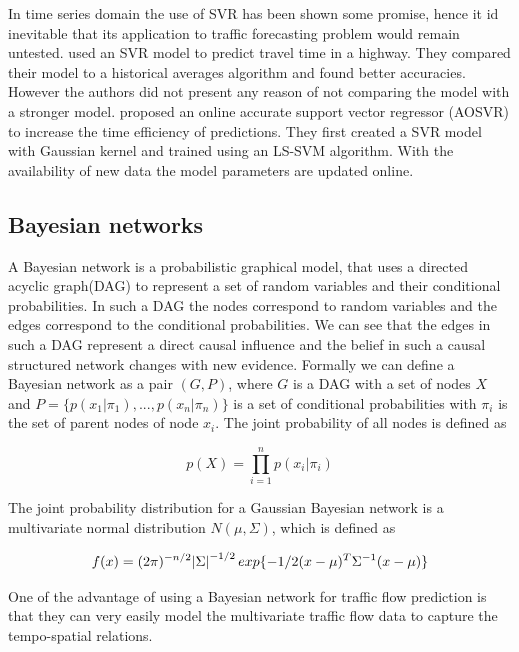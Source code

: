 In time series domain the use of SVR has been shown some promise, hence it id inevitable that its
application to traffic forecasting problem would remain untested. \citet{wu2004travel} used an SVR
model to predict travel time in a highway. They compared their model to a historical averages algorithm
and found better accuracies. However the authors did not present any reason of not comparing the model
with a stronger model.
\citet{zeng2008svr} proposed an online accurate support vector regressor (AOSVR) to increase the time
efficiency of predictions. They first created a SVR model with Gaussian kernel and trained using an
LS-SVM algorithm. With the availability of new data the model parameters are updated online.

\subsection{Bayesian networks}
A Bayesian network is a probabilistic graphical model, that uses a directed acyclic graph(DAG) to
represent a set of random variables and their conditional probabilities. In such a DAG the nodes
correspond to random variables and the edges correspond to the conditional probabilities. We can see
that the edges in such a DAG represent a direct causal influence and the belief in such a causal
structured network changes with new evidence. Formally we can define a Bayesian network as a
pair $(G,P)$, where $G$ is a DAG with a set of nodes $X$ and $P = \{p(x_{1}|\pi_{1}),..., p(x_{n}|\pi_{n})\}$
is a set of conditional probabilities with $\pi_{i}$ is the set of parent nodes of node $x_{i}$.
The joint probability of all nodes is defined as

     \begin{equation} p(X) =  \prod_{i = 1}^n p(x_{i}|\pi_{i}) \end{equation}

The joint probability distribution for a Gaussian Bayesian network is a multivariate
normal distribution $N(\mu, \Sigma)$, which is defined as

     \begin{equation}
      f(x) =  (2\pi)^{-n/2} \abs{\Sigma}^{-1/2} exp\{-1/2(x-\mu)^T \Sigma^{-1}(x-\mu)\}
     \end{equation}

One of the advantage of using a Bayesian network for traffic flow prediction is that they can
very easily model the multivariate traffic flow data to capture the tempo-spatial relations.

